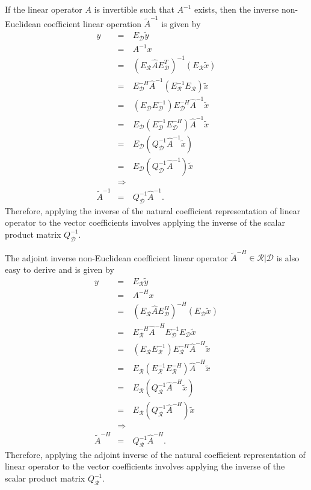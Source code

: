 If the linear operator $A$ is invertible such that $A^{-1}$ exists, then the
inverse non-Euclidean coefficient linear operation $\tilde{A}^{-1}$ is given
by
%
\begin{eqnarray}
y
& = & E_{\mathcal{D}} \tilde{y} \nonumber \\
& = & A^{-1} x \nonumber \\
& = & (E_{\mathcal{R}} \hat{A} E_{\mathcal{D}}^T)^{-1} (E_{\mathcal{R}} \tilde{x}) \nonumber \\
& = & E_{\mathcal{D}}^{-H} \hat{A}^{-1} (E_{\mathcal{R}}^{-1} E_{\mathcal{R}}) \tilde{x}  \nonumber \\
& = & ( E_{\mathcal{D}} E_{\mathcal{D}}^{-1} ) E_{\mathcal{D}}^{-H} \hat{A}^{-1} \tilde{x}  \nonumber \\
& = & E_{\mathcal{D}} (E_{\mathcal{D}}^{-1} E_{\mathcal{D}}^{-H}) \hat{A}^{-1} \tilde{x}  \nonumber \\
& = & E_{\mathcal{D}} ( Q_{\mathcal{D}}^{-1} \hat{A}^{-1} \tilde{x} ) \nonumber \\
& = & E_{\mathcal{D}} ( Q_{\mathcal{D}}^{-1} \hat{A}^{-1} ) \tilde{x} \nonumber \\
& \Rightarrow &  \nonumber \\
\tilde{A}^{-1} & = & Q_{\mathcal{D}}^{-1} \hat{A}^{-1}.
\label{eqn:A_natural_matrix_inverse_apply}
\end{eqnarray}
%
Therefore, applying the inverse of the natural coefficient representation of
linear operator to the vector coefficients involves applying the inverse of
the scalar product matrix $Q_{\mathcal{D}}^{-1}$.

The adjoint inverse non-Euclidean coefficient linear operator
$\tilde{A}^{-H}\in\mathcal{R}|\mathcal{D}$ is also easy to derive and is given
by
%
\begin{eqnarray}
y
& = & E_{\mathcal{R}} \tilde{y} \nonumber \\
& = & A^{-H} x \nonumber \\
& = & (E_{\mathcal{R}} \hat{A} E_{\mathcal{D}}^H)^{-H} (E_{\mathcal{D}} \tilde{x}) \nonumber \\
& = & E_{\mathcal{R}}^{-H} \hat{A}^{-H} E_{\mathcal{D}}^{-1} E_{\mathcal{D}} \tilde{x}  \nonumber \\
& = & ( E_{\mathcal{R}} E_{\mathcal{R}}^{-1} ) E_{\mathcal{R}}^{-H} \hat{A}^{-H} \tilde{x}  \nonumber \\
& = & E_{\mathcal{R}} (E_{\mathcal{R}}^{-1} E_{\mathcal{R}}^{-H}) \hat{A}^{-H} \tilde{x}  \nonumber \\
& = & E_{\mathcal{R}} ( Q_{\mathcal{R}}^{-1} \hat{A}^{-H} \tilde{x} ) \nonumber \\
& = & E_{\mathcal{R}} ( Q_{\mathcal{R}}^{-1} \hat{A}^{-H} ) \tilde{x} \nonumber \\
& \Rightarrow &  \nonumber \\
\tilde{A}^{-H} & = & Q_{\mathcal{R}}^{-1} \hat{A}^{-H}.
\label{eqn:A_natural_matrix_adjoint_inverse_apply}
\end{eqnarray}
%
Therefore, applying the adjoint inverse of the natural coefficient
representation of linear operator to the vector coefficients involves applying
the inverse of the scalar product matrix $Q_{\mathcal{R}}^{-1}$.

